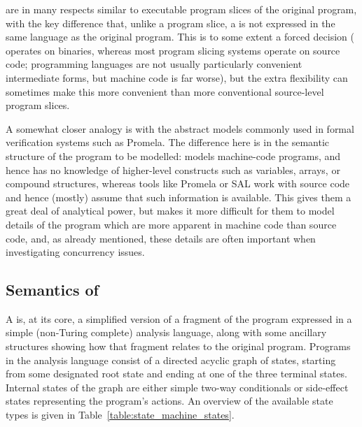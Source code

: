 {\STateMachines} are in many respects similar to executable program
slices of the original program, with the key difference that, unlike a
program slice, a {\StateMachine} is not expressed in the same language
as the original program.  This is to some extent a forced decision
({\technique} operates on binaries, whereas most program slicing
systems operate on source code; programming languages are not usually
particularly convenient intermediate forms, but machine code is far
worse), but the extra flexibility can sometimes make this more
convenient than more conventional source-level program
slices.

A somewhat closer analogy is with the abstract models commonly used in
formal verification systems such as Promela\needCite{}.  The
difference here is in the semantic structure of the program to be
modelled: {\technique} models machine-code programs, and hence has no
knowledge of higher-level constructs such as variables, arrays, or
compound structures, whereas tools like Promela or SAL\needCite{} work
with source code and hence (mostly) assume that such information is available.  This
gives them a great deal of analytical power, but makes it more
difficult for them to model details of the program which are more
apparent in machine code than source code, and, as already mentioned,
these details are often important when investigating concurrency
issues.


\subsection{Semantics of {\StateMachines}}

A {\StateMachine} is, at its core, a simplified version of a fragment
of the program expressed in a simple (non-Turing complete) analysis
language, along with some ancillary structures showing how that
fragment relates to the original program.  Programs in the analysis
language consist of a directed acyclic graph of states, starting from
some designated root state and ending at one of the three terminal
states.  Internal states of the graph are either simple two-way
conditionals or side-effect states representing the program's actions.
An overview of the available state types is given in
Table~\ref{table:state_machine_states}.

